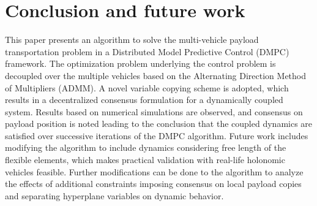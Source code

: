 \documentclass[letterpaper, 10 pt, conference]{ieeeconf}
\begin{document}
 \section{Conclusion and future work}
This paper presents an algorithm to solve the multi-vehicle payload transportation problem in a Distributed Model Predictive Control (DMPC) framework. The optimization problem underlying the control problem is decoupled over the multiple vehicles based on the Alternating Direction Method of Multipliers (ADMM). A novel variable copying scheme is adopted, which results in a decentralized consensus formulation for a dynamically coupled system. Results based on numerical simulations are observed, and consensus on payload position is noted leading to the conclusion that the coupled dynamics are satisfied over successive iterations of the DMPC algorithm. Future work includes modifying the algorithm to include dynamics considering free length of the flexible elements, which makes practical validation with real-life holonomic vehicles feasible. Further modifications can be done to the algorithm to analyze the effects of additional constraints imposing consensus on local payload copies and separating hyperplane variables on dynamic behavior.


\end{document}
